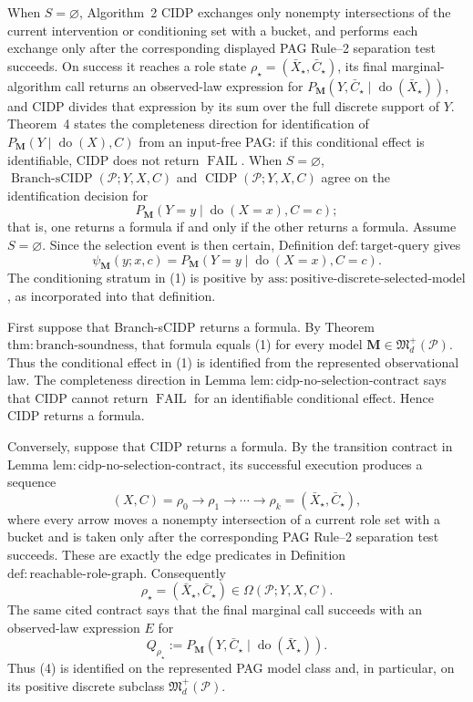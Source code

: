 When \(S=\varnothing\), Algorithm~2 CIDP exchanges only nonempty intersections of the current intervention or conditioning set with a bucket, and performs each exchange only after the corresponding displayed PAG Rule--2 separation test succeeds.  On success it reaches a role state \(\rho_\star=(\bar X_\star,\bar C_\star)\), its final marginal-algorithm call returns an observed-law expression for \(P_{\mathbf M}(Y,\bar C_\star\mid\operatorname{do}(\bar X_\star))\), and CIDP divides that expression by its sum over the full discrete support of \(Y\).  Theorem~4 states the completeness direction for identification of \(P_{\mathbf M}(Y\mid\operatorname{do}(X),C)\) from an input-free PAG: if this conditional effect is identifiable, CIDP does not return \(\operatorname{FAIL}\).
When \(S=\varnothing\), \(\operatorname{Branch\text{-}sCIDP}(\mathcal P;Y,X,C)\) and \(\operatorname{CIDP}(\mathcal P;Y,X,C)\) agree on the identification decision for
\[
 P_{\mathbf M}(Y=y\mid\operatorname{do}(X=x),C=c);
\]
that is, one returns a formula if and only if the other returns a formula.
Assume \(S=\varnothing\).  Since the selection event is then certain, Definition \(\mathrm{def{:}target\text{-}query}\) gives
\[
 \psi_{\mathbf M}(y;x,c)
 =P_{\mathbf M}(Y=y\mid\operatorname{do}(X=x),C=c).
 \tag{1}
\]
The conditioning stratum in (1) is positive by \(\mathrm{ass{:}positive\text{-}discrete\text{-}selected\text{-}model}\), as incorporated into that definition.

First suppose that Branch-sCIDP returns a formula.  By Theorem \(\mathrm{thm{:}branch\text{-}soundness}\), that formula equals (1) for every model \(\mathbf M\in\mathfrak M_d^+(\mathcal P)\).  Thus the conditional effect in (1) is identified from the represented observational law.  The completeness direction in Lemma \(\mathrm{lem{:}cidp\text{-}no\text{-}selection\text{-}contract}\) says that CIDP cannot return \(\operatorname{FAIL}\) for an identifiable conditional effect.  Hence CIDP returns a formula.

Conversely, suppose that CIDP returns a formula.  By the transition contract in Lemma \(\mathrm{lem{:}cidp\text{-}no\text{-}selection\text{-}contract}\), its successful execution produces a sequence
\[
 (X,C)=\rho_0\longrightarrow\rho_1\longrightarrow\cdots
 \longrightarrow\rho_k=(\bar X_\star,\bar C_\star),
 \tag{2}
\]
where every arrow moves a nonempty intersection of a current role set with a bucket and is taken only after the corresponding PAG Rule--2 separation test succeeds.  These are exactly the edge predicates in Definition \(\mathrm{def{:}reachable\text{-}role\text{-}graph}\).  Consequently
\[
 \rho_\star=(\bar X_\star,\bar C_\star)
 \in\Omega(\mathcal P;Y,X,C).
 \tag{3}
\]
The same cited contract says that the final marginal call succeeds with an observed-law expression \(E\) for
\[
 Q_{\rho_\star}
 :=P_{\mathbf M}(Y,\bar C_\star
       \mid\operatorname{do}(\bar X_\star)).
 \tag{4}
\]
Thus (4) is identified on the represented PAG model class and, in particular, on its positive discrete subclass \(\mathfrak M_d^+(\mathcal P)\).

